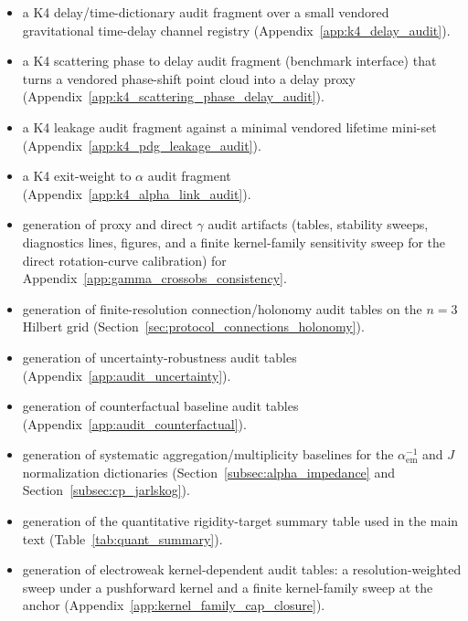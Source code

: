 \begin{itemize}
\item a K4 delay/time-dictionary audit fragment over a small vendored gravitational time-delay channel registry (Appendix~\ref{app:k4_delay_audit}).
\item a K4 scattering phase to delay audit fragment (benchmark interface) that turns a vendored phase-shift point cloud into a delay proxy (Appendix~\ref{app:k4_scattering_phase_delay_audit}).
\item a K4 leakage audit fragment against a minimal vendored lifetime mini-set (Appendix~\ref{app:k4_pdg_leakage_audit}).
\item a K4 exit-weight to $\alpha$ audit fragment (Appendix~\ref{app:k4_alpha_link_audit}).
\item generation of proxy and direct $\gamma$ audit artifacts (tables, stability sweeps, diagnostics lines, figures, and a finite kernel-family sensitivity sweep for the direct rotation-curve calibration) for Appendix~\ref{app:gamma_crossobs_consistency}.
\item generation of finite-resolution connection/holonomy audit tables on the $n=3$ Hilbert grid (Section~\ref{sec:protocol_connections_holonomy}).
\item generation of uncertainty-robustness audit tables (Appendix~\ref{app:audit_uncertainty}).
\item generation of counterfactual baseline audit tables (Appendix~\ref{app:audit_counterfactual}).
\item generation of systematic aggregation/multiplicity baselines for the $\alpha_{\mathrm{em}}^{-1}$ and $J$ normalization dictionaries (Section~\ref{subsec:alpha_impedance} and Section~\ref{subsec:cp_jarlskog}).
\item generation of the quantitative rigidity-target summary table used in the main text (Table~\ref{tab:quant_summary}).
\item generation of electroweak kernel-dependent audit tables: a resolution-weighted sweep under a pushforward kernel and a finite kernel-family sweep at the anchor (Appendix~\ref{app:kernel_family_cap_closure}).
\end{itemize}

